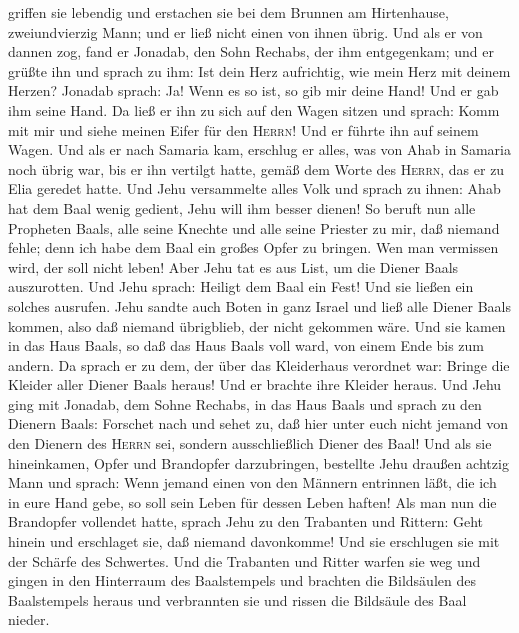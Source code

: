griffen sie lebendig und erstachen sie bei dem Brunnen am Hirtenhause,
zweiundvierzig Mann; und er ließ nicht einen von ihnen übrig.
 Und als er von dannen zog, fand er Jonadab, den Sohn
Rechabs, der ihm entgegenkam; und er grüßte ihn und sprach zu ihm: Ist
dein Herz aufrichtig, wie mein Herz mit deinem Herzen? Jonadab sprach:
Ja! Wenn es so ist, so gib mir deine Hand! Und er gab ihm seine Hand.
 Da ließ er ihn zu sich auf den Wagen sitzen und sprach:
Komm mit mir und siehe meinen Eifer für den \textsc{Herrn}! Und er
führte ihn auf seinem Wagen.  Und als er nach Samaria
kam, erschlug er alles, was von Ahab in Samaria noch übrig war, bis er
ihn vertilgt hatte, gemäß dem Worte des \textsc{Herrn}, das er zu Elia
geredet hatte.  Und Jehu versammelte alles Volk und
sprach zu ihnen: Ahab hat dem Baal wenig gedient, Jehu will ihm besser
dienen!  So beruft nun alle Propheten Baals, alle seine
Knechte und alle seine Priester zu mir, daß niemand fehle; denn ich habe
dem Baal ein großes Opfer zu bringen. Wen man vermissen wird, der soll
nicht leben! Aber Jehu tat es aus List, um die Diener Baals auszurotten.
 Und Jehu sprach: Heiligt dem Baal ein Fest! Und sie
ließen ein solches ausrufen.  Jehu sandte auch Boten in
ganz Israel und ließ alle Diener Baals kommen, also daß niemand
übrigblieb, der nicht gekommen wäre. Und sie kamen in das Haus Baals, so
daß das Haus Baals voll ward, von einem Ende bis zum andern.
 Da sprach er zu dem, der über das Kleiderhaus verordnet
war: Bringe die Kleider aller Diener Baals heraus! Und er brachte ihre
Kleider heraus.  Und Jehu ging mit Jonadab, dem Sohne
Rechabs, in das Haus Baals und sprach zu den Dienern Baals: Forschet
nach und sehet zu, daß hier unter euch nicht jemand von den Dienern des
\textsc{Herrn} sei, sondern ausschließlich Diener des Baal!
 Und als sie hineinkamen, Opfer und Brandopfer
darzubringen, bestellte Jehu draußen achtzig Mann und sprach: Wenn
jemand einen von den Männern entrinnen läßt, die ich in eure Hand gebe,
so soll sein Leben für dessen Leben haften!  Als man nun
die Brandopfer vollendet hatte, sprach Jehu zu den Trabanten und
Rittern: Geht hinein und erschlaget sie, daß niemand davonkomme! Und sie
erschlugen sie mit der Schärfe des Schwertes. Und die Trabanten und
Ritter warfen sie weg und gingen in den Hinterraum des Baalstempels
 und brachten die Bildsäulen des Baalstempels heraus und
verbrannten sie und rissen die Bildsäule des Baal nieder.
